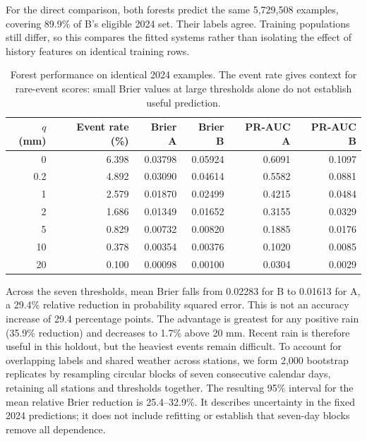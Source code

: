 For the direct comparison, both forests predict the same 5,729,508 examples, covering 89.9\% of B's eligible 2024 set. Their labels agree. Training populations still differ, so this compares the fitted systems rather than isolating the effect of history features on identical training rows.
\par
\begin{table}[htbp]\centering\small
\begin{tabular}{rrrrrr}\toprule
$q$ (mm) & Event rate (\%) & Brier A & Brier B & PR-AUC A & PR-AUC B\\\midrule
0 & 6.398 & 0.03798 & 0.05924 & 0.6091 & 0.1097\\
0.2 & 4.892 & 0.03090 & 0.04614 & 0.5582 & 0.0881\\
1 & 2.579 & 0.01870 & 0.02499 & 0.4215 & 0.0484\\
2 & 1.686 & 0.01349 & 0.01652 & 0.3155 & 0.0329\\
5 & 0.829 & 0.00732 & 0.00820 & 0.1885 & 0.0176\\
10 & 0.378 & 0.00354 & 0.00376 & 0.1020 & 0.0085\\
20 & 0.100 & 0.00098 & 0.00100 & 0.0304 & 0.0029\\\bottomrule
\end{tabular}
\caption{Forest performance on identical 2024 examples. The event rate gives context for rare-event scores: small Brier values at large thresholds alone do not establish useful prediction.}\label{tab:t2common}
\end{table}
\par
Across the seven thresholds, mean Brier falls from 0.02283 for B to 0.01613 for A, a 29.4\% relative reduction in probability squared error. This is not an accuracy increase of 29.4 percentage points. The advantage is greatest for any positive rain (35.9\% reduction) and decreases to 1.7\% above 20 mm. Recent rain is therefore useful in this holdout, but the heaviest events remain difficult.
To account for overlapping labels and shared weather across stations, we form 2,000 bootstrap replicates by resampling circular blocks of seven consecutive calendar days, retaining all stations and thresholds together. The resulting 95\% interval for the mean relative Brier reduction is 25.4--32.9\%. It describes uncertainty in the fixed 2024 predictions; it does not include refitting or establish that seven-day blocks remove all dependence.

